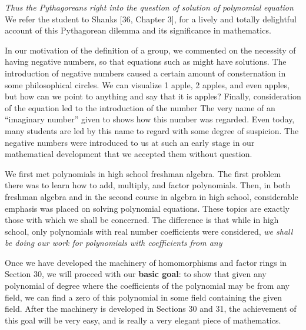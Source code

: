 \documentclass[11pt,oneside]{article}
\begin{document}
\begin{BookBody}

\textit{Thus the Pythagoreans}  \textit{right into the question of}  \textit{solution of}  \textit{polynomial} \textit{equation} We refer the student to Shanks [36, Chapter 3], for a lively and totally delightful account of this Pythagorean dilemma and its significance in mathematics.

In our motivation of the definition of a group, we commented on the necessity of having negative numbers, so that equations such as  might have solutions. The introduction of negative numbers caused a certain amount of consternation in some philosophical circles. We can visualize 1 apple, 2 apples, and even  apples, but how can we point to anything and say that it is  apples? Finally, consideration of the equation  led to the introduction of the number  The very name of an “imaginary number” given to  shows how this number was regarded. Even today, many students are led by this name to regard  with some degree of suspicion. The negative numbers were introduced to us at such an early stage in our mathematical development that we accepted them without question.

We first met polynomials in high school freshman algebra. The first problem there was to learn how to add, multiply, and factor polynomials. Then, in both freshman algebra and in the second course in algebra in high school, considerable emphasis was placed on solving polynomial equations. These topics are exactly those with which we shall be concerned. The difference is that while in high school, only polynomials with real number coefficients were considered,\textit{ we shall be doing our work for polynomials} \textit{with coefficients from any} 

Once we have developed the machinery of homomorphisms and factor rings in Section 30, we will proceed with our\textbf{ basic goal}: to show that given any polynomial of degree  where the coefficients of the polynomial may be from any field, we can find a zero of this polynomial in some field containing the given field. After the machinery is developed in Sections 30 and 31, the achievement of this goal will be very easy, and is really a very elegant piece of mathematics.


\end{BookBody}
\end{document}
